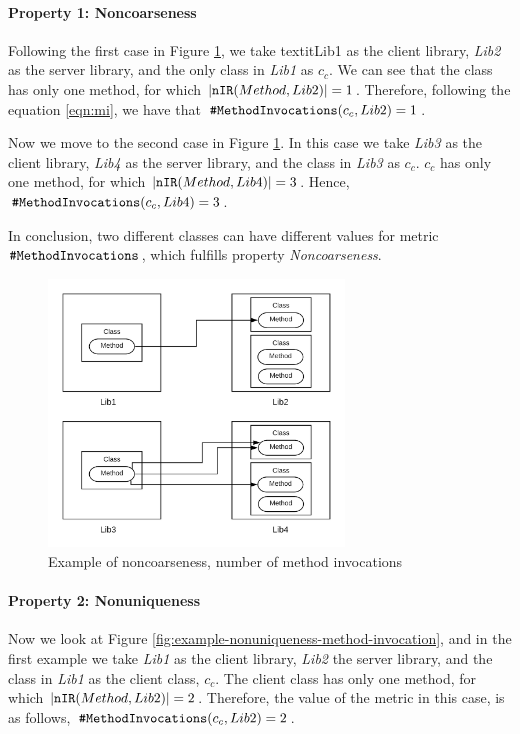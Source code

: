 \paragraph{Property 1: Noncoarseness}
Following the first case in Figure \ref{fig:example-noncoarseness-method-invocation}, we take textit{Lib1} as the client library, \textit{Lib2} as the server library, and the only class in \textit{Lib1} as $c_c$. We can see that the class has only one method, for which $|\verb|nIR|(Method, Lib2)| = 1$. Therefore, following the equation \ref{eqn:mi}, we have that $\verb|#MethodInvocations|(c_c, Lib2) = 1$.

Now we move to the second case in Figure \ref{fig:example-noncoarseness-method-invocation}. In this case we take \textit{Lib3} as the client library, \textit{Lib4} as the server library, and the class in \textit{Lib3} as $c_c$. $c_c$ has only one method, for which $|\verb|nIR|(Method, Lib4)| = 3$. Hence, $\verb|#MethodInvocations|(c_c, Lib4) = 3$.

In conclusion, two different classes can have different values for metric $\verb|#MethodInvocations|$, which fulfills property \textit{Noncoarseness}.

\begin{figure}[ht]
\begin{center}
\includegraphics[width=0.7\textwidth]{figures/Example-Distribution-1.png}
\caption{Example of noncoarseness, number of method invocations}
\label{fig:example-noncoarseness-method-invocation}
\end{center}
\end{figure}

\paragraph{Property 2: Nonuniqueness}
Now we look at Figure \ref{fig:example-nonuniqueness-method-invocation}, and in the first example we take \textit{Lib1} as the client library, \textit{Lib2} the server library, and the class in \textit{Lib1} as the client class, $c_c$. The client class has only one method, for which $|\verb|nIR|(Method, Lib2)| = 2$. Therefore, the value of the metric in this case, is as follows, $\verb|#MethodInvocations|(c_c, Lib2) = 2$.

